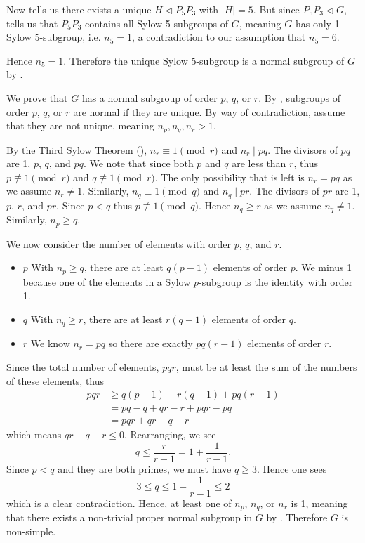 \begin{questions}
    Now  tells us there exists a unique $H \lhd P_5P_3$ with $|H| = 5$. But since $P_5P_3 \lhd G$,  tells us that $P_5P_3$ contains all Sylow 5-subgroups of $G$, meaning $G$ has only 1 Sylow 5-subgroup, i.e. $n_5 = 1$, a contradiction to our assumption that $n_5 = 6$.

    Hence $n_5 = 1$. Therefore the unique Sylow 5-subgroup is a normal subgroup of $G$ by .

    \item We prove that $G$ has a normal subgroup of order $p$, $q$, or $r$. By , subgroups of order $p$, $q$, or $r$ are normal if they are unique. By way of contradiction, assume that they are not unique, meaning $n_p, n_q, n_r > 1$.

    By the Third Sylow Theorem (), $n_r \equiv 1 \pmod r$ and $n_r \mid pq$. The divisors of $pq$ are 1, $p$, $q$, and $pq$. We note that since both $p$ and $q$ are less than $r$, thus $p \not\equiv 1 \pmod r$ and $q \not\equiv 1 \pmod r$. The only possibility that is left is $n_r = pq$ as we assume $n_r \neq 1$. Similarly, $n_q \equiv 1 \pmod q$ and $n_q \mid pr$. The divisors of $pr$ are 1, $p$, $r$, and $pr$. Since $p < q$ thus $p \not\equiv 1 \pmod q$. Hence $n_q \geq r$ as we assume $n_q \neq 1$. Similarly, $n_p \geq q$.

    We now consider the number of elements with order $p$, $q$, and $r$.
    \begin{itemize}
        \item $\boxed{p}$ With $n_p \geq q$, there are at least $q(p-1)$ elements of order $p$. We minus 1 because one of the elements in a Sylow $p$-subgroup is the identity with order 1.
        \item $\boxed{q}$ With $n_q \geq r$, there are at least $r(q-1)$ elements of order $q$.
        \item $\boxed{r}$ We know $n_r = pq$ so there are exactly $pq(r-1)$ elements of order $r$.
    \end{itemize}
    Since the total number of elements, $pqr$, must be at least the sum of the numbers of these elements, thus
    \begin{align*}
        pqr &\geq q(p-1) + r(q-1) + pq(r-1)\\
        &= pq - q + qr - r + pqr - pq\\
        &= pqr + qr - q - r
    \end{align*}
    which means $qr - q - r \leq 0$. Rearranging, we see
    \[
        q \leq \frac{r}{r-1} = 1 + \frac{1}{r-1}.
    \]
    Since $p < q$ and they are both primes, we must have $q \geq 3$. Hence one sees
    \[
        3 \leq q \leq 1 + \frac{1}{r-1} \leq 2
    \]
    which is a clear contradiction. Hence, at least one of $n_p$, $n_q$, or $n_r$ is 1, meaning that there exists a non-trivial proper normal subgroup in $G$ by . Therefore $G$ is non-simple.
\end{questions}
